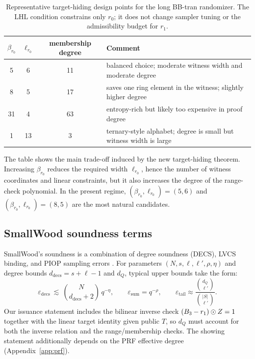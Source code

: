 \begin{table}[H]
\centering
\renewcommand{\arraystretch}{1.15}
\begin{tabular}{@{}cccl@{}}
\toprule
\(\beta_{r_0}\) & \(\ell_{r_0}\) & membership degree & \textbf{Comment} \\
\midrule
5  & 6 & 11 & balanced choice; moderate witness width and moderate degree \\
8  & 5 & 17 & saves one ring element in the witness; slightly higher degree \\
31 & 4 & 63 & entropy-rich but likely too expensive in proof degree \\
1  & 13 & 3 & ternary-style alphabet; degree is small but witness width is large \\
\bottomrule
\end{tabular}
\caption{Representative target-hiding design points for the long BB-tran randomizer.  The LHL condition constrains only
$r_0$; it does not change sampler tuning or the admissibility budget for $r_1$.}
\label{tab:lhl-design-points}
\end{table}

The table shows the main trade-off induced by the new target-hiding theorem.  Increasing \(\beta_{r_0}\) reduces the
required width \(\ell_{r_0}\), hence the number of witness coordinates and linear constraints, but it also increases the
degree of the range-check polynomial.  In the present regime, \((\beta_{r_0},\ell_{r_0})=(5,6)\) and
\((\beta_{r_0},\ell_{r_0})=(8,5)\) are the most natural candidates.

\subsection{SmallWood soundness terms}
SmallWood’s soundness is a combination of degree soundness (DECS), LVCS binding, and PIOP sampling errors
\cite{EPRINT:FenRiv25b}. For parameters \((N,s,\ell,\ell',\rho,\eta)\) and degree bounds \(d_{\mathrm{decs}}=s+\ell-1\)
and \(d_Q\), typical upper bounds take the form:
\[
\varepsilon_{\mathrm{decs}}\ \lesssim\ \binom{N}{d_{\mathrm{decs}}+2}\,q^{-\eta},
\qquad
\varepsilon_{\mathrm{sum}} = q^{-\rho},
\qquad
\varepsilon_{\mathrm{tail}} \approx \frac{\binom{d_Q}{\ell'}}{\binom{|S|}{\ell'}}.
\]
Our issuance statement includes the bilinear inverse check \((B_3-r_1)\odot Z=1\) together with the linear target identity given public \(T\), so \(d_Q\) must account for both the inverse relation and the range/membership checks.  The
showing statement additionally depends on the PRF effective degree (Appendix~\ref{app:prf}).

